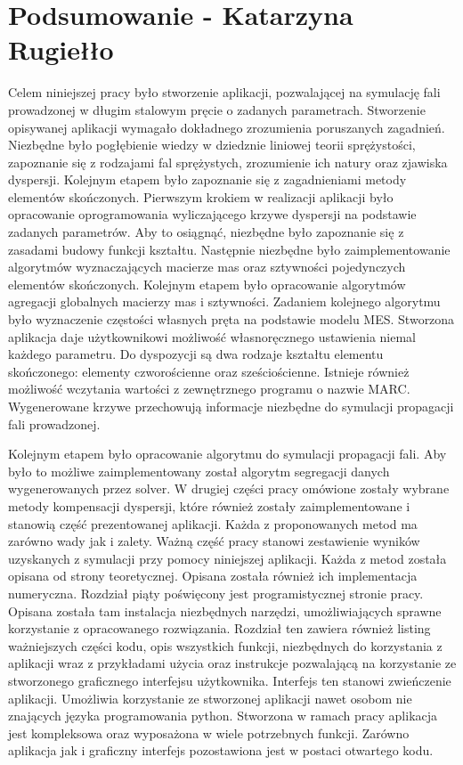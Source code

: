 \chapter{Podsumowanie - Katarzyna Rugiełło}
\label{cha:podsumowanie}

Celem niniejszej pracy było stworzenie aplikacji, pozwalającej na symulację fali prowadzonej w długim stalowym pręcie o zadanych parametrach. Stworzenie opisywanej aplikacji wymagało dokładnego zrozumienia poruszanych zagadnień. Niezbędne było pogłębienie wiedzy w dziedznie liniowej teorii sprężystości, zapoznanie się z rodzajami fal sprężystych, zrozumienie ich natury oraz zjawiska dyspersji. Kolejnym etapem było zapoznanie się z zagadnieniami metody elementów skończonych. Pierwszym krokiem w realizacji aplikacji było opracowanie oprogramowania wyliczającego krzywe dyspersji na podstawie zadanych parametrów. Aby to osiągnąć, niezbędne było zapoznanie się z zasadami budowy funkcji kształtu. Następnie niezbędne było zaimplementowanie algorytmów wyznaczających macierze mas oraz sztywności pojedynczych elementów skończonych. Kolejnym etapem było opracowanie algorytmów agregacji globalnych macierzy mas i sztywności. Zadaniem kolejnego algorytmu było wyznaczenie częstości własnych pręta na podstawie modelu MES. Stworzona aplikacja daje użytkownikowi możliwość własnoręcznego ustawienia niemal każdego parametru. Do dyspozycji są dwa rodzaje kształtu elementu skończonego: elementy czworościenne oraz sześciościenne. Istnieje również możliwość wczytania wartości z zewnętrznego programu o nazwie MARC. Wygenerowane krzywe przechowują informacje niezbędne do symulacji propagacji fali prowadzonej. 

Kolejnym etapem było opracowanie algorytmu do symulacji propagacji fali. Aby było to możliwe zaimplementowany został algorytm segregacji danych wygenerowanych przez solver. W drugiej części pracy omówione zostały wybrane metody kompensacji dyspersji, które również zostały zaimplementowane i stanowią część prezentowanej aplikacji. Każda z proponowanych metod ma zarówno wady jak i zalety. Ważną część pracy stanowi zestawienie wyników uzyskanych z symulacji przy pomocy niniejszej aplikacji. Każda z metod została opisana od strony teoretycznej. Opisana została również ich implementacja numeryczna. Rozdział piąty poświęcony jest programistycznej stronie pracy. Opisana została tam instalacja niezbędnych narzędzi, umożliwiających sprawne korzystanie z opracowanego rozwiązania. Rozdział ten zawiera również listing ważniejszych części kodu, opis wszystkich funkcji, niezbędnych do korzystania z aplikacji wraz z przykładami użycia oraz instrukcje pozwalającą na korzystanie ze stworzonego graficznego interfejsu użytkownika. Interfejs ten stanowi zwieńczenie aplikacji. Umożliwia korzystanie ze stworzonej aplikacji nawet osobom nie znających języka programowania python. Stworzona w ramach pracy aplikacja jest kompleksowa oraz wyposażona w wiele potrzebnych funkcji. Zarówno aplikacja jak i graficzny interfejs pozostawiona jest w postaci otwartego kodu. 

